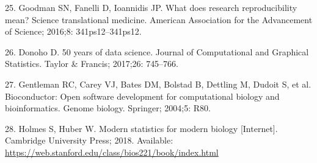 \documentclass[10pt,letterpaper]{article}
\begin{document}
\leavevmode\hypertarget{ref-goodman2016}{}%
25. Goodman SN, Fanelli D, Ioannidis JP. What does research
reproducibility mean? Science translational medicine. American
Association for the Advancement of Science; 2016;8: 341ps12--341ps12.

\leavevmode\hypertarget{ref-donoho2017}{}%
26. Donoho D. 50 years of data science. Journal of Computational and
Graphical Statistics. Taylor \& Francis; 2017;26: 745--766.

\leavevmode\hypertarget{ref-gentleman2004}{}%
27. Gentleman RC, Carey VJ, Bates DM, Bolstad B, Dettling M, Dudoit S,
et al. Bioconductor: Open software development for computational biology
and bioinformatics. Genome biology. Springer; 2004;5: R80.

\leavevmode\hypertarget{ref-holmes2018}{}%
28. Holmes S, Huber W. Modern statistics for modern biology
{[}Internet{]}. Cambridge University Press; 2018. Available:
\url{https://web.stanford.edu/class/bios221/book/index.html}

\nolinenumbers
\end{document}
